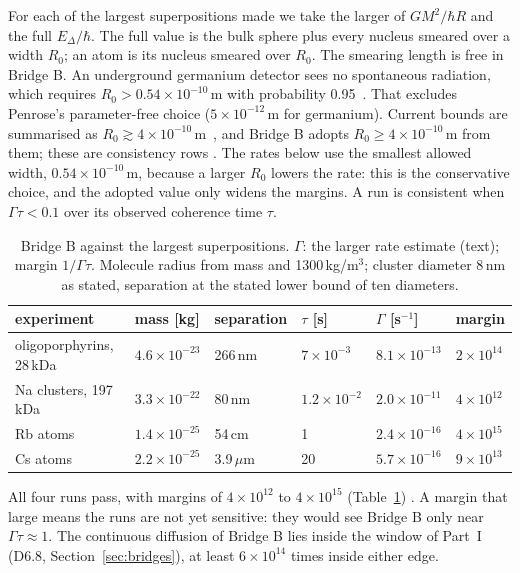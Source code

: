 For each of the largest superpositions made we take the larger of $GM^2/\hbar R$ and the full $E_\Delta/\hbar$. The full value is the bulk
sphere plus every nucleus smeared over a width $R_0$; an atom is its nucleus smeared over $R_0$. The smearing length is free in Bridge B.
An underground germanium detector sees no spontaneous radiation, which requires $R_0>0.54\times10^{-10}$\,m with probability
0.95~\cite{donadi}. That excludes Penrose's parameter-free choice ($5\times10^{-12}$\,m for germanium). Current bounds are summarised as
$R_0\gtrsim4\times10^{-10}$\,m~\cite{figurato}, and Bridge B adopts $R_0\ge4\times10^{-10}$\,m from them; these are consistency rows
. The rates below use the smallest allowed width, $0.54\times10^{-10}$\,m, because a larger $R_0$ lowers the rate: this is
the conservative choice, and the adopted value only widens the margins. A run is consistent when $\Gamma\tau<0.1$ over its observed
coherence time $\tau$.

\begin{table}[!t]
\centering\small
\caption{Bridge B against the largest superpositions. $\Gamma$: the larger rate estimate (text); margin $1/\Gamma\tau$. Molecule radius from mass
and 1300\,kg/m$^3$; cluster diameter 8\,nm as stated, separation at the stated lower bound of ten diameters.}
\label{tab:data-bridgeB}
\begin{tabular}{@{}llllll@{}}
\toprule
experiment & mass [kg] & separation & $\tau$ [s] & $\Gamma$ [s$^{-1}$] & margin \\
\midrule
oligoporphyrins, 28\,kDa~\cite{fein2019} & $4.6\times10^{-23}$ & 266\,nm & $7\times10^{-3}$ & $8.1\times10^{-13}$ & $2\times10^{14}$ \\
Na clusters, 197\,kDa~\cite{pedalino2025} & $3.3\times10^{-22}$ & 80\,nm & $1.2\times10^{-2}$ & $2.0\times10^{-11}$ & $4\times10^{12}$ \\
Rb atoms~\cite{kovachy2015} & $1.4\times10^{-25}$ & 54\,cm & 1 & $2.4\times10^{-16}$ & $4\times10^{15}$ \\
Cs atoms~\cite{xu2019} & $2.2\times10^{-25}$ & 3.9\,$\mu$m & 20 & $5.7\times10^{-16}$ & $9\times10^{13}$ \\
\bottomrule
\end{tabular}
\end{table}

All four runs pass, with margins of $4\times10^{12}$ to $4\times10^{15}$ (Table~\ref{tab:data-bridgeB}) . A margin that
large means the runs are not yet sensitive: they would see Bridge B only near $\Gamma\tau\approx1$. The continuous diffusion of Bridge B lies
inside the window of Part~I (D6.8, Section~\ref{sec:bridges}), at least $6\times10^{14}$ times inside either edge.

